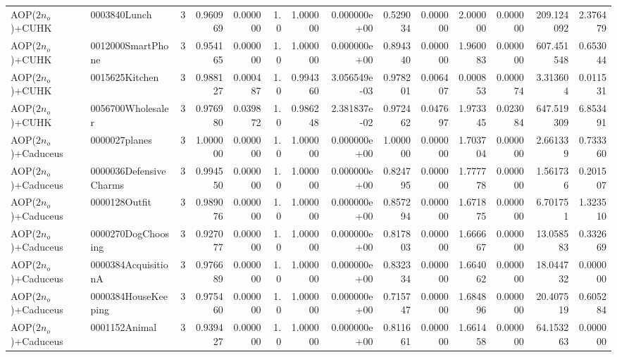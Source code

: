 \begin{tabular}{llrr|r|rr|rr|rr|rrr}
        AOP($2 n_o$)+CUHK &           0003840Lunch &       3 & 0.960969 & 0.000000 &  1.0 &      1.000000 & 0.000000e+00 &      0.529034 & 0.000000 &      2.000000 &    0.000000 &   209.124092 &    2.376479 \\
        AOP($2 n_o$)+CUHK &      0012000SmartPhone &       3 & 0.954165 & 0.000000 &  1.0 &      1.000000 & 0.000000e+00 &      0.894340 & 0.000000 &      1.960083 &    0.000000 &   607.451548 &    0.653044 \\
        AOP($2 n_o$)+CUHK &         0015625Kitchen &       3 & 0.988127 & 0.000487 &  1.0 &      0.994360 & 3.056549e-03 &      0.978201 & 0.006407 &      0.000853 &    0.000074 &     3.313604 &    0.011531 \\
        AOP($2 n_o$)+CUHK &      0056700Wholesaler &       3 & 0.976980 & 0.039872 &  1.0 &      0.986248 & 2.381837e-02 &      0.972462 & 0.047697 &      1.973345 &    0.023084 &   647.519309 &    6.853491 \\
    AOP($2 n_o$)+Caduceus &          0000027planes &       3 & 1.000000 & 0.000000 &  1.0 &      1.000000 & 0.000000e+00 &      1.000000 & 0.000000 &      1.703704 &    0.000000 &     2.661339 &    0.733360 \\
    AOP($2 n_o$)+Caduceus & 0000036DefensiveCharms &       3 & 0.994550 & 0.000000 &  1.0 &      1.000000 & 0.000000e+00 &      0.824795 & 0.000000 &      1.777778 &    0.000000 &     1.561736 &    0.201507 \\
    AOP($2 n_o$)+Caduceus &          0000128Outfit &       3 & 0.989076 & 0.000000 &  1.0 &      1.000000 & 0.000000e+00 &      0.857294 & 0.000000 &      1.671875 &    0.000000 &     6.701751 &    1.323510 \\
    AOP($2 n_o$)+Caduceus &     0000270DogChoosing &       3 & 0.927077 & 0.000000 &  1.0 &      1.000000 & 0.000000e+00 &      0.817803 & 0.000000 &      1.666667 &    0.000000 &    13.058583 &    0.332669 \\
    AOP($2 n_o$)+Caduceus &    0000384AcquisitionA &       3 & 0.976689 & 0.000000 &  1.0 &      1.000000 & 0.000000e+00 &      0.832334 & 0.000000 &      1.664062 &    0.000000 &    18.044732 &    0.000000 \\
    AOP($2 n_o$)+Caduceus &    0000384HouseKeeping &       3 & 0.975460 & 0.000000 &  1.0 &      1.000000 & 0.000000e+00 &      0.715747 & 0.000000 &      1.684896 &    0.000000 &    20.407519 &    0.605284 \\
    AOP($2 n_o$)+Caduceus &          0001152Animal &       3 & 0.939427 & 0.000000 &  1.0 &      1.000000 & 0.000000e+00 &      0.811661 & 0.000000 &      1.661458 &    0.000000 &    64.153263 &    0.000000 \\

\end{tabular}
